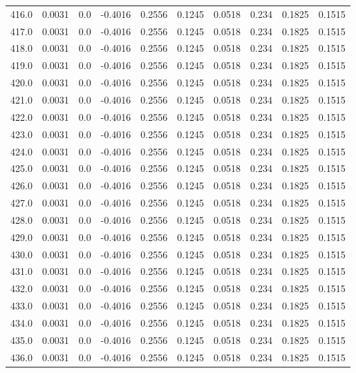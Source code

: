 \begin{longtable}{lrrrrrrrrr}
416.0 & 0.0031 & 0.0 & -0.4016 & 0.2556 & 0.1245 & 0.0518 & 0.234 & 0.1825 & 0.1515 \\
417.0 & 0.0031 & 0.0 & -0.4016 & 0.2556 & 0.1245 & 0.0518 & 0.234 & 0.1825 & 0.1515 \\
418.0 & 0.0031 & 0.0 & -0.4016 & 0.2556 & 0.1245 & 0.0518 & 0.234 & 0.1825 & 0.1515 \\
419.0 & 0.0031 & 0.0 & -0.4016 & 0.2556 & 0.1245 & 0.0518 & 0.234 & 0.1825 & 0.1515 \\
420.0 & 0.0031 & 0.0 & -0.4016 & 0.2556 & 0.1245 & 0.0518 & 0.234 & 0.1825 & 0.1515 \\
421.0 & 0.0031 & 0.0 & -0.4016 & 0.2556 & 0.1245 & 0.0518 & 0.234 & 0.1825 & 0.1515 \\
422.0 & 0.0031 & 0.0 & -0.4016 & 0.2556 & 0.1245 & 0.0518 & 0.234 & 0.1825 & 0.1515 \\
423.0 & 0.0031 & 0.0 & -0.4016 & 0.2556 & 0.1245 & 0.0518 & 0.234 & 0.1825 & 0.1515 \\
424.0 & 0.0031 & 0.0 & -0.4016 & 0.2556 & 0.1245 & 0.0518 & 0.234 & 0.1825 & 0.1515 \\
425.0 & 0.0031 & 0.0 & -0.4016 & 0.2556 & 0.1245 & 0.0518 & 0.234 & 0.1825 & 0.1515 \\
426.0 & 0.0031 & 0.0 & -0.4016 & 0.2556 & 0.1245 & 0.0518 & 0.234 & 0.1825 & 0.1515 \\
427.0 & 0.0031 & 0.0 & -0.4016 & 0.2556 & 0.1245 & 0.0518 & 0.234 & 0.1825 & 0.1515 \\
428.0 & 0.0031 & 0.0 & -0.4016 & 0.2556 & 0.1245 & 0.0518 & 0.234 & 0.1825 & 0.1515 \\
429.0 & 0.0031 & 0.0 & -0.4016 & 0.2556 & 0.1245 & 0.0518 & 0.234 & 0.1825 & 0.1515 \\
430.0 & 0.0031 & 0.0 & -0.4016 & 0.2556 & 0.1245 & 0.0518 & 0.234 & 0.1825 & 0.1515 \\
431.0 & 0.0031 & 0.0 & -0.4016 & 0.2556 & 0.1245 & 0.0518 & 0.234 & 0.1825 & 0.1515 \\
432.0 & 0.0031 & 0.0 & -0.4016 & 0.2556 & 0.1245 & 0.0518 & 0.234 & 0.1825 & 0.1515 \\
433.0 & 0.0031 & 0.0 & -0.4016 & 0.2556 & 0.1245 & 0.0518 & 0.234 & 0.1825 & 0.1515 \\
434.0 & 0.0031 & 0.0 & -0.4016 & 0.2556 & 0.1245 & 0.0518 & 0.234 & 0.1825 & 0.1515 \\
435.0 & 0.0031 & 0.0 & -0.4016 & 0.2556 & 0.1245 & 0.0518 & 0.234 & 0.1825 & 0.1515 \\
436.0 & 0.0031 & 0.0 & -0.4016 & 0.2556 & 0.1245 & 0.0518 & 0.234 & 0.1825 & 0.1515 \\

\end{longtable}
